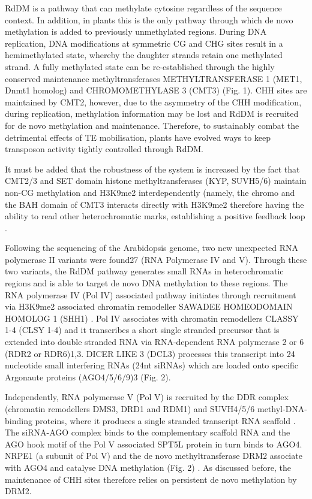 RdDM is a pathway that can methylate cytosine regardless of the sequence context. In addition, in plants this is the only pathway through which de novo methylation is added to previously unmethylated regions. During DNA replication, DNA modifications at symmetric CG and CHG sites result in a hemimethylated state, whereby the daughter strands retain one methylated strand. A fully methylated state can be re-established through the highly conserved maintenance methyltransferases METHYLTRANSFERASE 1 (MET1, Dnmt1 homolog) and CHROMOMETHYLASE 3 (CMT3) (Fig. 1). CHH sites are maintained by CMT2, however, due to the asymmetry of the CHH modification, during replication, methylation information may be lost and RdDM is recruited for de novo methylation and maintenance. Therefore, to sustainably combat the detrimental effects of TE mobilisation, plants have evolved ways to keep transposon activity tightly controlled through RdDM.

It must be added that the robustness of the system is increased by the fact that CMT2/3 and SET domain histone methyltransferases (KYP, SUVH5/6) maintain non-CG methylation and H3K9me2 interdependently (namely, the chromo and the BAH domain of CMT3 interacts directly with H3K9me2 therefore having the ability to read other heterochromatic marks, establishing a positive feedback loop \citep{RN33}.

Following  the sequencing of the Arabidopsis genome, two new unexpected RNA polymerase II variants were found27 (RNA Polymerase IV and V). Through these two variants, the RdDM pathway generates small RNAs in heterochromatic regions and is able to target de novo DNA methylation to these regions. 
The RNA polymerase IV (Pol IV) associated pathway initiates through recruitment via H3K9me2 associated chromatin remodeller SAWADEE HOMEODOMAIN HOMOLOG 1 (SHH1) \citep{RN116}. Pol IV associates with chromatin remodellers CLASSY 1-4 (CLSY 1-4) and it transcribes a short single stranded precursor \citep{RN117} that is extended into double stranded RNA via RNA-dependent RNA polymerase 2 or 6 (RDR2 or RDR6)1,3. DICER LIKE 3 (DCL3) processes this transcript into 24 nucleotide small interfering RNAs (24nt siRNAs) which are loaded onto specific Argonaute proteins (AGO4/5/6/9)3 (Fig. 2).

Independently, RNA polymerase V (Pol V) is recruited by the DDR complex (chromatin remodellers DMS3, DRD1 and RDM1) and SUVH4/5/6 methyl-DNA-binding proteins, where it produces a single stranded transcript RNA scaffold \citep{RN33}. The siRNA-AGO complex binds to the complementary scaffold RNA and the AGO hook motif of the Pol V associated SPT5L protein in turn binds to AGO4. NRPE1 (a subunit of Pol V) and the de novo methyltransferase DRM2 associate with AGO4 and catalyse DNA methylation (Fig. 2)  \citep{RN228,RN121,RN122}. As discussed before, the maintenance of CHH sites therefore relies on persistent de novo methylation by DRM2.

